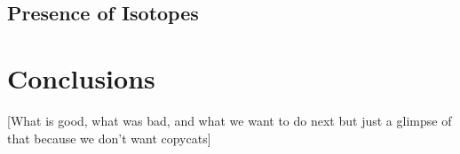 \documentclass[twocolumn, draft]{emulateapj}
\begin{document}
\subsection{Presence of Isotopes}

\section{Conclusions}
\label{sec:conclusions}

[What is good, what was bad, and what we want to do next but just a glimpse of that because we don't want copycats]


\end{document}
